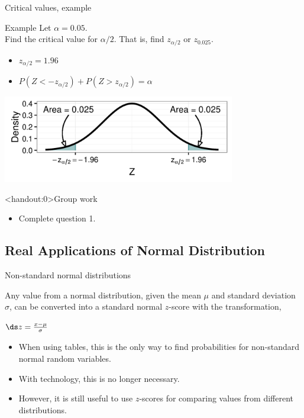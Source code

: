 \documentclass[xcolor=table, handout]{beamer}
\begin{document}
\begin{frame}{Critical values, example}
\begin{exampleblock}{Example}
Let $\alpha = 0.05$.\\
\medskip
Find the critical value for $\alpha/2$. That is, find $z_{\alpha/2}$ or $z_{0.025}$.
\begin{itemize}
\pause\item $z_{\alpha/2} = 1.96$
\item $P(Z < -z_{\alpha/2}) + P(Z > z_{\alpha/2}) = \alpha$
\end{itemize}
\end{exampleblock}
\smallskip
{\centering
\includegraphics[width=4in]{../images/ch6_crit2}
\par}

\end{frame}

\begin{frame}<handout:0>{Group work}
\begin{block}{}
\large
\begin{itemize}
\item Complete question 1.
\end{itemize}
\end{block}
\end{frame}

\subsection{Real Applications of  Normal Distribution}

\begin{frame}{Non-standard normal distributions}
\begin{block}{}
Any value from a normal distribution, given the mean $\mu$ and standard deviation $\sigma$, can be converted into a standard normal $z$-score with the transformation,\\
\smallskip
{\centering
$\ds z = \frac {x - \mu}{\sigma}$
\par}
\smallskip
\begin{itemize}
\pause\item When using tables, this is the only way to find probabilities for non-standard normal random variables.
\pause\item With technology, this is no longer necessary.
\pause\item However, it is still useful to use $z$-scores for comparing values from different distributions.
\end{itemize}
\end{block}
\end{frame}
\end{document}
